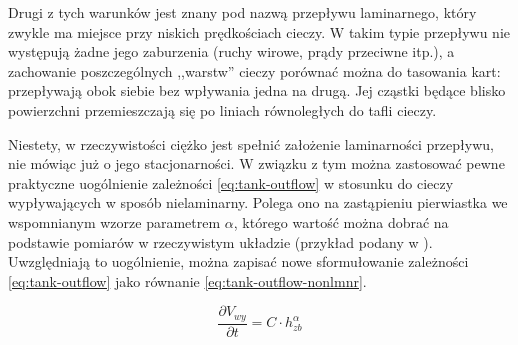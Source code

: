 Drugi z tych warunków jest znany pod nazwą przepływu laminarnego, który zwykle ma miejsce przy niskich prędkościach cieczy. W takim typie przepływu nie występują żadne jego zaburzenia (ruchy wirowe, prądy przeciwne itp.), a zachowanie poszczególnych ,,warstw'' cieczy porównać można do tasowania kart: przepływają obok siebie bez wpływania jedna na drugą. Jej cząstki będące blisko powierzchni przemieszczają się po liniach równoległych do tafli cieczy.

Niestety, w rzeczywistości ciężko jest spełnić założenie laminarności przepływu, nie mówiąc już o jego stacjonarności. W związku z tym można zastosować pewne praktyczne uogólnienie zależności \ref{eq:tank-outflow} w stosunku do cieczy wypływających w sposób nielaminarny. Polega ono na zastąpieniu pierwiastka we wspomnianym wzorze parametrem $\alpha$, którego wartość można dobrać na podstawie pomiarów w rzeczywistym układzie (przykład podany w \cite{TanksManual}). Uwzględniają to uogólnienie, można zapisać nowe sformułowanie zależności \ref{eq:tank-outflow} jako równanie \ref{eq:tank-outflow-nonlmnr}.

\begin{equation}\label{eq:tank-outflow-nonlmnr}
    \frac{\partial V_{wy}}{\partial t} = C\cdot h_{zb}^{\alpha}
\end{equation}
